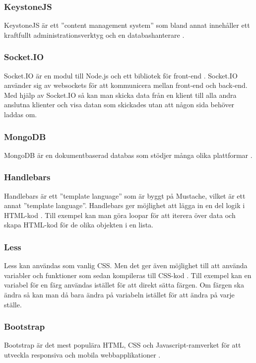 \documentclass{article}
\begin{document}
\subsubsection{KeystoneJS}
KeystoneJS är ett ''content management system'' som bland annat innehåller ett kraftfullt administrationsverktyg och en databashanterare \cite{keystonejs}.

\subsubsection{Socket.IO}
Socket.IO är en modul till Node.js och ett bibliotek för front-end \cite{socketio}. Socket.IO använder sig av websockets för att kommunicera mellan front-end och back-end. Med hjälp av Socket.IO så kan man skicka data från en klient till alla andra anslutna klienter och visa datan som skickades utan att någon sida behöver laddas om.

\subsubsection{MongoDB}
MongoDB är en dokumentbaserad databas som stödjer många olika plattformar \cite{mongodb}.

\subsubsection{Handlebars}
Handlebars är ett ''template language'' som är byggt på Mustache, vilket är ett annat ''template language''. Handlebars ger möjlighet att lägga in en del logik i HTML-kod \cite{handlebars}. Till exempel kan man göra loopar för att iterera över data och skapa HTML-kod för de olika objekten i en lista.  

\subsubsection{Less}
Less kan användas som vanlig CSS. Men det ger även möjlighet till att använda variabler och funktioner som sedan kompileras till CSS-kod \cite{less}. Till exempel kan en variabel för en färg användas istället för att direkt sätta färgen. Om färgen ska ändra så kan man då bara ändra på variabeln istället för att ändra på varje ställe.

\subsubsection{Bootstrap}
Bootstrap är det mest populära HTML, CSS och Javascript-ramverket för att utveckla responsiva och mobila webbapplikationer \cite{bootstrap}. 
\end{document}
